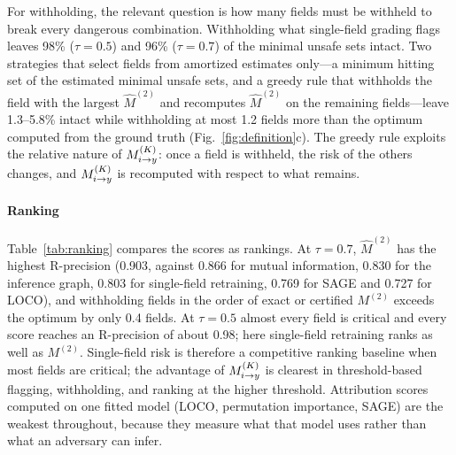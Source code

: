 For withholding, the relevant question is how many fields must be withheld to break every
dangerous combination. Withholding what single-field grading flags leaves 98\% ($\tau=0.5$) and
96\% ($\tau=0.7$) of the minimal unsafe sets intact. Two strategies that select fields from
amortized estimates only---a minimum hitting set of the estimated minimal unsafe sets, and a
greedy rule that withholds the field with the largest $\hat M^{(2)}$ and recomputes $\hat
M^{(2)}$ on the remaining fields---leave 1.3--5.8\% intact while withholding at most 1.2 fields
more than the optimum computed from the ground truth (Fig.~\ref{fig:definition}c). The greedy
rule exploits the relative nature of $M^{(K)}_{i\to y}$: once a field is withheld, the risk of the others
changes, and $M^{(K)}_{i\to y}$ is recomputed with respect to what remains.



\paragraph{Ranking}
Table~\ref{tab:ranking} compares the scores as rankings. At $\tau=0.7$, $\hat M^{(2)}$ has the
highest R-precision (0.903, against 0.866 for mutual information, 0.830 for the inference graph,
0.803 for single-field retraining, 0.769 for SAGE and 0.727 for LOCO), and withholding fields in
the order of exact or certified $M^{(2)}$ exceeds the optimum by only 0.4 fields. At $\tau=0.5$
almost every field is critical and every score reaches an R-precision of about 0.98; here
single-field retraining ranks as well as $M^{(2)}$. Single-field risk is therefore a competitive ranking baseline when most fields are critical; the advantage of $M^{(K)}_{i\to y}$ is clearest in threshold-based flagging, withholding, and ranking at the higher threshold. Attribution scores computed on one fitted
model (LOCO, permutation importance, SAGE) are the weakest throughout, because they measure what
that model uses rather than what an adversary can infer.




